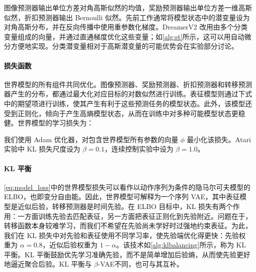 图像预测器输出单位方差对角高斯似然的均值，奖励预测器输出单位方差一维高斯似然，折扣预测器输出 Bernoulli 似然。先前工作通常将模型状态中的潜变量设为对角高斯分布，并在反向传播中使用重参数化梯度\citep{kingma2013vae,rezende2014vae}。DreamerV2 改用由多个分类变量组成的向量，并通过直通梯度优化这些变量\citep{bengio2013straight}；如\cref{alg:st}所示，这可以用自动微分方便地实现。分类潜变量相对于高斯潜变量的可能优势会在实验部分讨论。

\paragraph{损失函数}

世界模型的所有组件共同优化。图像预测器、奖励预测器、折扣预测器和转移预测器产生的分布，都通过最大化对应目标的对数似然进行训练。表征模型则通过下式中的期望项进行训练，使其产生有利于这些预测任务的模型状态。此外，该模型还受到正则化，倾向于产生高熵模型状态，从而在训练中对多种可能模型状态更稳健。世界模型的学习损失为：


我们使用 Adam 优化器\citep{kingma2014adam}，对包含世界模型所有参数的向量 $\phi$ 最小化该损失。Atari 实验中 KL 损失尺度设为 $\beta=0.1$，连续控制实验中设为 $\beta=1.0$\citep{higgins2016beta}。

\paragraph{KL 平衡}

\cref{eq:model_loss}中的世界模型损失可以看作以动作序列为条件的隐马尔可夫模型的 ELBO，也即变分自由能。因此，世界模型可解释为一个序列 VAE，其中表征模型是近似后验，转移预测器是时间先验。在 ELBO 目标中，KL 损失有两个作用：一方面训练先验去匹配表征，另一方面把表征正则化到先验附近。问题在于，转移函数本身较难学习，而我们不希望在先验尚未学好时过强地约束表征。为此，我们在 KL 损失中对先验和表征使用不同学习率，使先验端优化得更快：先验权重为 $\alpha=0.8$，近似后验权重为 $1-\alpha$。该技术如\cref{alg:klbalancing}所示，称为 KL 平衡。KL 平衡鼓励优先学习准确先验，而不是简单增加后验熵，从而使先验更好地逼近聚合后验。KL 平衡与 $\beta$-VAE\citep{higgins2016beta}不同，也可与其互补。


